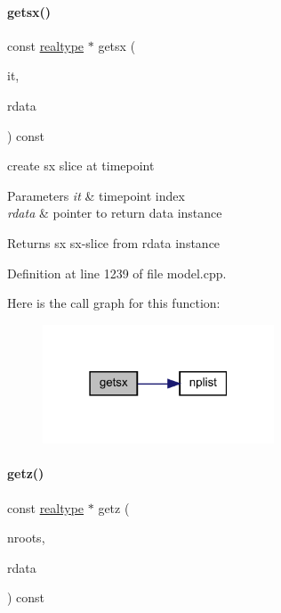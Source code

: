\paragraph{\texorpdfstring{getsx()}{getsx()}}
{\footnotesize\ttfamily const \mbox{\hyperlink{namespaceamici_a1bdce28051d6a53868f7ccbf5f2c14a3}{realtype}} $\ast$ getsx (\begin{DoxyParamCaption}\item[{const int}]{it,  }\item[{const \mbox{\hyperlink{classamici_1_1_return_data}{Return\+Data}} $\ast$}]{rdata }\end{DoxyParamCaption}) const\hspace{0.3cm}{\ttfamily [protected]}}

create sx slice at timepoint 
\begin{DoxyParams}{Parameters}
{\em it} & timepoint index \\
\hline
{\em rdata} & pointer to return data instance \\
\hline
\end{DoxyParams}
\begin{DoxyReturn}{Returns}
sx sx-\/slice from rdata instance 
\end{DoxyReturn}


Definition at line 1239 of file model.\+cpp.

Here is the call graph for this function\+:
\nopagebreak
\begin{figure}[H]
\begin{center}
\leavevmode
\includegraphics[width=195pt]{classamici_1_1_model_ae808a142aab292ef1b424bc3a0d924a0_cgraph}
\end{center}
\end{figure}
\mbox{\label{classamici_1_1_model_a30571e418f94ca61b8df2b355e46ee1a}} 
\paragraph{\texorpdfstring{getz()}{getz()}}
{\footnotesize\ttfamily const \mbox{\hyperlink{namespaceamici_a1bdce28051d6a53868f7ccbf5f2c14a3}{realtype}} $\ast$ getz (\begin{DoxyParamCaption}\item[{const int}]{nroots,  }\item[{const \mbox{\hyperlink{classamici_1_1_return_data}{Return\+Data}} $\ast$}]{rdata }\end{DoxyParamCaption}) const\hspace{0.3cm}{\ttfamily [protected]}}

